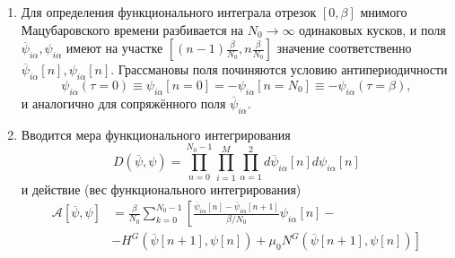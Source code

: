 \begin{enumerate}
	\item Для определения функционального интеграла отрезок $[0,\beta]$ мнимого Мацубаровского времени разбивается на $N_0 \rightarrow \infty$ одинаковых кусков, и поля $\overline{\psi}_{i\alpha}, \psi_{i\alpha}$ имеют на участке $\left[ (n-1)\frac{\beta}{N_0}, n\frac{\beta}{N_0} \right]$ значение соответственно $\overline{\psi}_{i\alpha}[n], \psi_{i\alpha}[n]$. Грассмановы поля починяются условию антипериодичности 
	\begin{equation}
		\label{eq:Psi_boundary_cond}
		\psi_{i\alpha}(\tau=0) \equiv \psi_{i\alpha}[n = 0] = - \psi_{i\alpha}[n = N_0] \equiv -\psi_{i\alpha}(\tau=\beta),
	\end{equation}
	и аналогично для сопряжённого поля $\overline{\psi}_{i\alpha}$.
	
	\item Вводится мера функционального интегрирования
	$$
	D\left(\overline{\psi},\psi\right) = \prod_{n = 0}^{N_0 - 1} \prod_{i = 1}^{M} \prod_{\alpha = 1}^{2} d\overline{\psi}_{i\alpha}[n] d\psi_{i\alpha}[n]
	$$
	и действие (вес функционального интегрирования)
	\begin{equation}
		\label{eq:Action_discretized}
		\begin{split}
			\mathcal{A} \left[\overline{\psi}, \psi\right] & = \frac{\beta}{N_0} \sum_{k = 0}^{N_0 - 1}  \left[ \frac{\overline{\psi}_{i\alpha}[n] - \overline{\psi}_{i\alpha}[n + 1]}{\beta/N_0} \psi_{i\alpha}[n] - \right. \\ 
			& \left. -  H^{G}\left(\overline{\psi}[n+1],\psi[n] \right) + \mu_0 N^{G}\left(\overline{\psi}[n+1],\psi[n] \right) \right]
		\end{split}
	\end{equation}
	

\end{enumerate}
